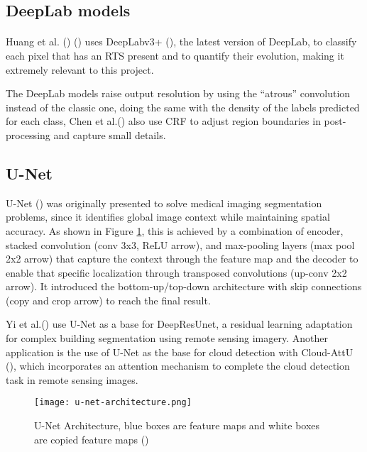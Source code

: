 \subsection{DeepLab models}
\paragraph{}
Huang et al. (\cite{HUANG2020111534}) (\cite{HUANG2021102399}) uses DeepLabv3+ (\cite{Chen_2018_ECCV}), the latest version of DeepLab, to classify each pixel that has an \gls{RTS} present and to quantify their evolution, making it extremely relevant to this project.

The DeepLab models raise output resolution by using the “atrous” convolution instead of the classic one, doing the same with the density of the labels predicted for each class, Chen et al.(\cite{chen2016semantic}) also use \gls{CRF} to adjust region boundaries in post-processing and capture small details.

\subsection{U-Net}
U-Net (\cite{ronneberger2015unet}) was originally presented to solve medical imaging segmentation problems, since it identifies global image context while maintaining spatial accuracy. As shown in Figure \ref{fig_unet}, this is achieved by a combination of encoder, stacked convolution (conv 3x3, \gls{ReLU} arrow), and max-pooling layers (max pool 2x2 arrow) that capture the context through the feature map and the decoder to enable that specific localization through transposed convolutions (up-conv 2x2 arrow). It introduced the bottom-up/top-down architecture with skip connections (copy and crop arrow) to reach the final result.

Yi et al.(\cite{rs11151774}) use U-Net as a base for DeepResUnet, a residual learning adaptation for complex building segmentation using remote sensing imagery. Another application is the use of U-Net as the base for cloud detection with Cloud-AttU (\cite{sym12061056}), which incorporates an attention mechanism to complete the cloud detection task in remote sensing images.

    \begin{figure}[hbt!]
        \centering
        \texttt{[image: u-net-architecture.png]}
        \caption{U-Net Architecture, blue boxes are feature maps and white boxes are copied feature maps (\cite{ronneberger2015unet})}
        \label{fig_unet}
    \end{figure}
